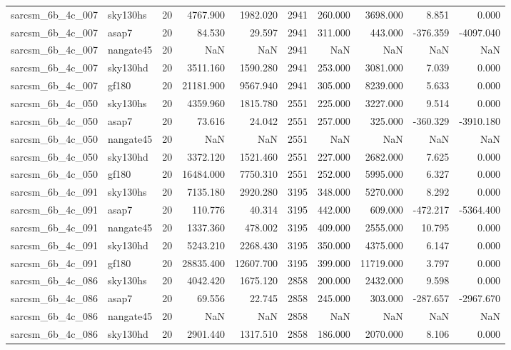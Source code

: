 \documentclass{article}
\begin{document}
\begin{longtable}{llrrrrrrrr}
sarcsm\_6b\_4c\_007 & sky130hs & 20 & 4767.900 & 1982.020 & 2941 & 260.000 & 3698.000 & 8.851 & 0.000 \\
sarcsm\_6b\_4c\_007 & asap7 & 20 & 84.530 & 29.597 & 2941 & 311.000 & 443.000 & -376.359 & -4097.040 \\
sarcsm\_6b\_4c\_007 & nangate45 & 20 & NaN & NaN & 2941 & NaN & NaN & NaN & NaN \\
sarcsm\_6b\_4c\_007 & sky130hd & 20 & 3511.160 & 1590.280 & 2941 & 253.000 & 3081.000 & 7.039 & 0.000 \\
sarcsm\_6b\_4c\_007 & gf180 & 20 & 21181.900 & 9567.940 & 2941 & 305.000 & 8239.000 & 5.633 & 0.000 \\
sarcsm\_6b\_4c\_050 & sky130hs & 20 & 4359.960 & 1815.780 & 2551 & 225.000 & 3227.000 & 9.514 & 0.000 \\
sarcsm\_6b\_4c\_050 & asap7 & 20 & 73.616 & 24.042 & 2551 & 257.000 & 325.000 & -360.329 & -3910.180 \\
sarcsm\_6b\_4c\_050 & nangate45 & 20 & NaN & NaN & 2551 & NaN & NaN & NaN & NaN \\
sarcsm\_6b\_4c\_050 & sky130hd & 20 & 3372.120 & 1521.460 & 2551 & 227.000 & 2682.000 & 7.625 & 0.000 \\
sarcsm\_6b\_4c\_050 & gf180 & 20 & 16484.000 & 7750.310 & 2551 & 252.000 & 5995.000 & 6.327 & 0.000 \\
sarcsm\_6b\_4c\_091 & sky130hs & 20 & 7135.180 & 2920.280 & 3195 & 348.000 & 5270.000 & 8.292 & 0.000 \\
sarcsm\_6b\_4c\_091 & asap7 & 20 & 110.776 & 40.314 & 3195 & 442.000 & 609.000 & -472.217 & -5364.400 \\
sarcsm\_6b\_4c\_091 & nangate45 & 20 & 1337.360 & 478.002 & 3195 & 409.000 & 2555.000 & 10.795 & 0.000 \\
sarcsm\_6b\_4c\_091 & sky130hd & 20 & 5243.210 & 2268.430 & 3195 & 350.000 & 4375.000 & 6.147 & 0.000 \\
sarcsm\_6b\_4c\_091 & gf180 & 20 & 28835.400 & 12607.700 & 3195 & 399.000 & 11719.000 & 3.797 & 0.000 \\
sarcsm\_6b\_4c\_086 & sky130hs & 20 & 4042.420 & 1675.120 & 2858 & 200.000 & 2432.000 & 9.598 & 0.000 \\
sarcsm\_6b\_4c\_086 & asap7 & 20 & 69.556 & 22.745 & 2858 & 245.000 & 303.000 & -287.657 & -2967.670 \\
sarcsm\_6b\_4c\_086 & nangate45 & 20 & NaN & NaN & 2858 & NaN & NaN & NaN & NaN \\
sarcsm\_6b\_4c\_086 & sky130hd & 20 & 2901.440 & 1317.510 & 2858 & 186.000 & 2070.000 & 8.106 & 0.000 \\

\end{longtable}
\end{document}
